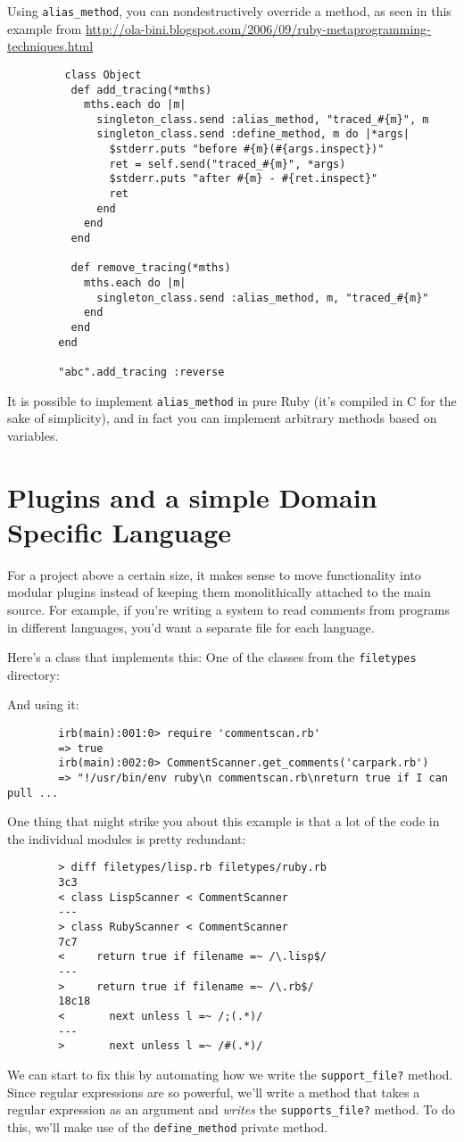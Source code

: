 \documentclass[12pt]{article}
\begin{document}
	Using \verb|alias_method|, you can nondestructively override a method, as seen in this example from \url{http://ola-bini.blogspot.com/2006/09/ruby-metaprogramming-techniques.html}
	\begin{verbatim}
		 class Object
		  def add_tracing(*mths)
		    mths.each do |m|
		      singleton_class.send :alias_method, "traced_#{m}", m
		      singleton_class.send :define_method, m do |*args|
		        $stderr.puts "before #{m}(#{args.inspect})"
		        ret = self.send("traced_#{m}", *args)
		        $stderr.puts "after #{m} - #{ret.inspect}"
		        ret
		      end
		    end
		  end

		  def remove_tracing(*mths)
		    mths.each do |m|
		      singleton_class.send :alias_method, m, "traced_#{m}"
		    end
		  end
		end

		"abc".add_tracing :reverse
	\end{verbatim}
	
	It is possible to implement \verb|alias_method| in pure Ruby (it's compiled in C for the sake of simplicity), and in fact you can implement arbitrary methods based on variables.
	
	\section{Plugins and a simple Domain Specific Language}
	For a project above a certain size, it makes sense to move functionality into modular plugins instead of keeping them monolithically attached to the main source.  For example, if you're writing a system to read comments from programs in different languages, you'd want a separate file for each language.
	
	Here's a class that implements this:
	One of the classes from the \verb|filetypes| directory:
	
	And using it:
	\begin{verbatim}
		irb(main):001:0> require 'commentscan.rb'
		=> true
		irb(main):002:0> CommentScanner.get_comments('carpark.rb')
		=> "!/usr/bin/env ruby\n commentscan.rb\nreturn true if I can pull ...
	\end{verbatim}
	
	One thing that might strike you about this example is that a lot of the code in the individual modules is pretty redundant:
	\begin{verbatim}
		> diff filetypes/lisp.rb filetypes/ruby.rb 
		3c3
		< class LispScanner < CommentScanner
		---
		> class RubyScanner < CommentScanner
		7c7
		<     return true if filename =~ /\.lisp$/
		---
		>     return true if filename =~ /\.rb$/
		18c18
		<       next unless l =~ /;(.*)/
		---
		>       next unless l =~ /#(.*)/
	\end{verbatim}
	We can start to fix this by automating how we write the \verb|support_file?| method.  Since regular expressions are so powerful, we'll write a method that takes a regular expression as an argument and \emph{writes} the \verb|supports_file?| method.  To do this, we'll make use of the \verb|define_method| private method.
	
\end{document}
